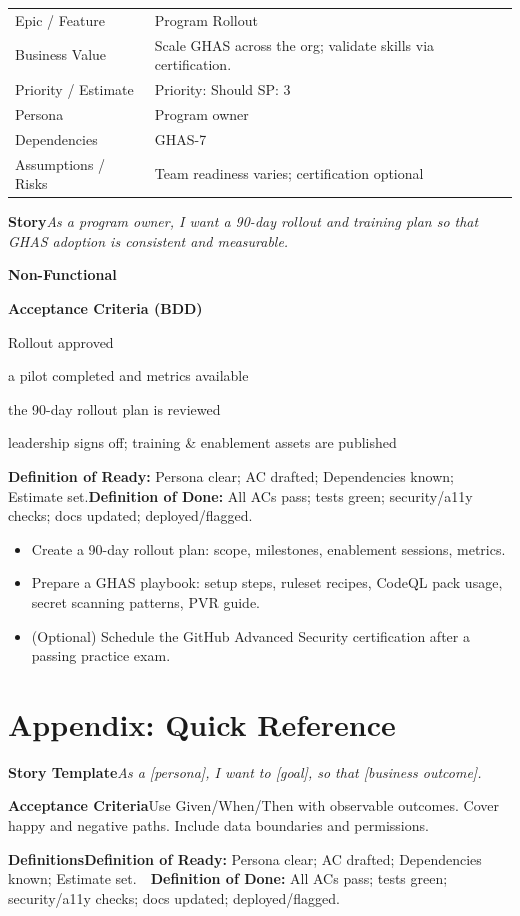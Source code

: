 \documentclass[11pt,a4paper]{article}
\newcommand{\cb}{\(\square\)}
\newenvironment{GHASCard}[2]{%
  \begin{tcolorbox}[ghascard,title={\ghasheader{#1 --- #2}}]
  \small
}{%
  \end{tcolorbox}
}
\newenvironment{GHASTasks}{%
  \begin{tcolorbox}[ghastasks]
  \small
  \begin{itemize}[label=\cb, leftmargin=*, labelsep=0.6em]
}{%
  \end{itemize}
  \end{tcolorbox}
}
\newcommand{\DoR}{\textbf{Definition of Ready:} Persona clear; AC drafted; Dependencies known; Estimate set.}
\newcommand{\DoD}{\textbf{Definition of Done:} All ACs pass; tests green; security/a11y checks; docs updated; deployed/flagged.}
\begin{document}
\begin{GHASCard}{GHAS-8}{Rollout Plan \& (Optional) Certification}
\begin{tabularx}{\linewidth}{L V}
Epic / Feature & Program Rollout \tabularnewline
Business Value & Scale GHAS across the org; validate skills via certification. \tabularnewline
Priority / Estimate & Priority: Should \quad SP: 3 \tabularnewline
Persona & Program owner \tabularnewline
Dependencies & GHAS-7 \tabularnewline
Assumptions / Risks & Team readiness varies; certification optional \tabularnewline
\end{tabularx}

\medskip
\textbf{Story}\quad \emph{As a program owner, I want a 90-day rollout and training plan so that GHAS adoption is consistent and measurable.}

\medskip
\textbf{Non-Functional}\quad
{}\ 

\medskip
\textbf{Acceptance Criteria (BDD)}
\begin{description}[leftmargin=2.7cm, labelwidth=2.6cm, style=nextline]
  \item[\textbf{Scenario}] Rollout approved
  \item[\textbf{Given}] a pilot completed and metrics available
  \item[\textbf{When}] the 90-day rollout plan is reviewed
  \item[\textbf{Then}] leadership signs off; training \& enablement assets are published
\end{description}

\medskip
\DoR\quad\textbullet\quad\DoD
\end{GHASCard}

\begin{GHASTasks}
\item Create a 90-day rollout plan: scope, milestones, enablement sessions, metrics.
\item Prepare a GHAS playbook: setup steps, ruleset recipes, CodeQL pack usage, secret scanning patterns, PVR guide.
\item (Optional) Schedule the GitHub Advanced Security certification after a passing practice exam.
\end{GHASTasks}

\section{Appendix: Quick Reference}
\textbf{Story Template}\quad \emph{As a [persona], I want to [goal], so that [business outcome].}

\textbf{Acceptance Criteria}\quad Use Given/When/Then with observable outcomes. Cover happy and negative paths. Include data boundaries and permissions.

\textbf{Definitions}\quad \DoR\ \ \DoD
\end{document}
